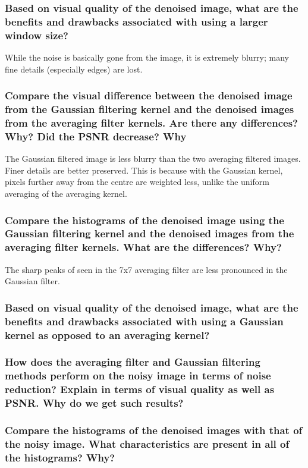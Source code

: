 \documentclass[article, 1.5space, letterpaper, 12pt, oneside, header, footer]{SydeClass}
\begin{document}
\subsubsection{Based on visual quality of the denoised image, what are the benefits and drawbacks associated with
using a larger window size?}
While the noise is basically gone from the image, it is extremely blurry; many fine details (especially edges) are lost.


\subsubsection{Compare the visual difference between the denoised image from the Gaussian filtering kernel and the
denoised images from the averaging filter kernels. Are there any differences? Why? Did the PSNR
decrease? Why}
The Gaussian filtered image is less blurry than the two averaging filtered images. Finer details are better preserved. This is because with the Gaussian kernel, pixels further away from the centre are weighted less, unlike the uniform averaging of the averaging kernel.


\subsubsection{Compare the histograms of the denoised image using the Gaussian filtering kernel and the denoised
images from the averaging filter kernels. What are the differences? Why?}
The sharp peaks of seen in the 7x7 averaging filter are less pronounced in the Gaussian filter. 


\subsubsection{Based on visual quality of the denoised image, what are the benefits and drawbacks associated with
using a Gaussian kernel as opposed to an averaging kernel?}


\subsubsection{How does the averaging filter and Gaussian filtering methods perform on the noisy image in terms of
noise reduction? Explain in terms of visual quality as well as PSNR. Why do we get such results?}


\subsubsection{Compare the histograms of the denoised images with that of the noisy image. What characteristics
are present in all of the histograms? Why?}
\end{document}
